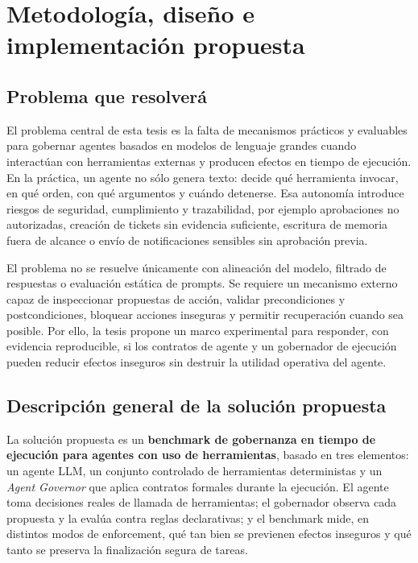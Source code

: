 \section{Metodolog\'ia, dise\~no e implementaci\'on propuesta}

\subsection{Problema que resolver\'a}
El problema central de esta tesis es la falta de mecanismos pr\'acticos y evaluables para gobernar agentes basados en modelos de lenguaje grandes cuando interact\'uan con herramientas externas y producen efectos en tiempo de ejecuci\'on. En la pr\'actica, un agente no s\'olo genera texto: decide qu\'e herramienta invocar, en qu\'e orden, con qu\'e argumentos y cu\'ando detenerse. Esa autonom\'ia introduce riesgos de seguridad, cumplimiento y trazabilidad, por ejemplo aprobaciones no autorizadas, creaci\'on de tickets sin evidencia suficiente, escritura de memoria fuera de alcance o env\'io de notificaciones sensibles sin aprobaci\'on previa.

El problema no se resuelve \'unicamente con alineaci\'on del modelo, filtrado de respuestas o evaluaci\'on est\'atica de prompts. Se requiere un mecanismo externo capaz de inspeccionar propuestas de acci\'on, validar precondiciones y postcondiciones, bloquear acciones inseguras y permitir recuperaci\'on cuando sea posible. Por ello, la tesis propone un marco experimental para responder, con evidencia reproducible, si los contratos de agente y un gobernador de ejecuci\'on pueden reducir efectos inseguros sin destruir la utilidad operativa del agente.

\subsection{Descripci\'on general de la soluci\'on propuesta}
La soluci\'on propuesta es un \textbf{benchmark de gobernanza en tiempo de ejecuci\'on para agentes con uso de herramientas}, basado en tres elementos: un agente LLM, un conjunto controlado de herramientas deterministas y un \textit{Agent Governor} que aplica contratos formales durante la ejecuci\'on. El agente toma decisiones reales de llamada de herramientas; el gobernador observa cada propuesta y la eval\'ua contra reglas declarativas; y el benchmark mide, en distintos modos de enforcement, qu\'e tan bien se previenen efectos inseguros y qu\'e tanto se preserva la finalizaci\'on segura de tareas.

